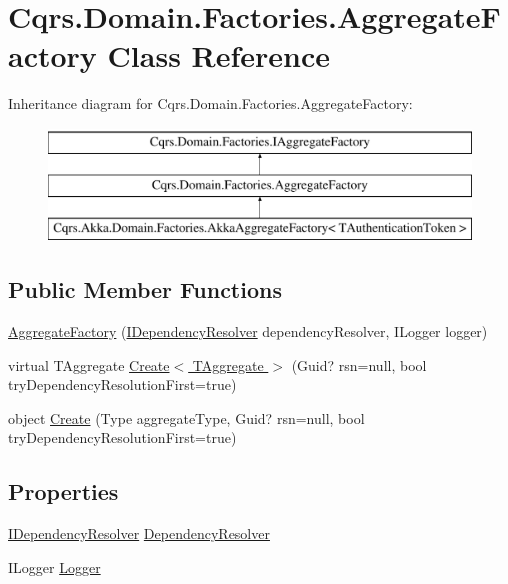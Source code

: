 \hypertarget{classCqrs_1_1Domain_1_1Factories_1_1AggregateFactory}{}\section{Cqrs.\+Domain.\+Factories.\+Aggregate\+Factory Class Reference}
\label{classCqrs_1_1Domain_1_1Factories_1_1AggregateFactory}
Inheritance diagram for Cqrs.\+Domain.\+Factories.\+Aggregate\+Factory\+:\begin{figure}[H]
\begin{center}
\leavevmode
\includegraphics[height=3.000000cm]{classCqrs_1_1Domain_1_1Factories_1_1AggregateFactory}
\end{center}
\end{figure}
\subsection*{Public Member Functions}
\begin{DoxyCompactItemize}
\item 
\hyperlink{classCqrs_1_1Domain_1_1Factories_1_1AggregateFactory_a8731bed6c8a8594c17bf0d32ff83939a}{Aggregate\+Factory} (\hyperlink{interfaceCqrs_1_1Configuration_1_1IDependencyResolver}{I\+Dependency\+Resolver} dependency\+Resolver, I\+Logger logger)
\item 
virtual T\+Aggregate \hyperlink{classCqrs_1_1Domain_1_1Factories_1_1AggregateFactory_ac155d6c1e55ba37bacf420185b652092}{Create$<$ T\+Aggregate $>$} (Guid? rsn=null, bool try\+Dependency\+Resolution\+First=true)
\item 
object \hyperlink{classCqrs_1_1Domain_1_1Factories_1_1AggregateFactory_a917794af09bb3f51629e7abc231f8441}{Create} (Type aggregate\+Type, Guid? rsn=null, bool try\+Dependency\+Resolution\+First=true)
\end{DoxyCompactItemize}
\subsection*{Properties}
\begin{DoxyCompactItemize}
\item 
\hyperlink{interfaceCqrs_1_1Configuration_1_1IDependencyResolver}{I\+Dependency\+Resolver} \hyperlink{classCqrs_1_1Domain_1_1Factories_1_1AggregateFactory_acae0733e4069776322e0c4cb5d335c09}{Dependency\+Resolver}
\item 
I\+Logger \hyperlink{classCqrs_1_1Domain_1_1Factories_1_1AggregateFactory_a78a24b5139cda7a07f938169a406f66e}{Logger}
\end{DoxyCompactItemize}


